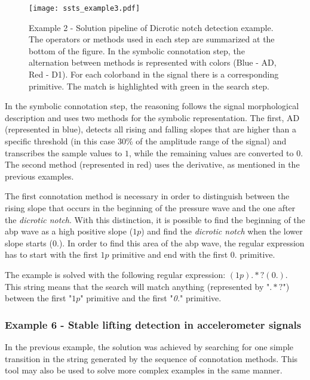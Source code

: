 \begin{figure}[H]
  \centering
      \texttt{[image: ssts\_example3.pdf]}
  \caption{Example 2 - Solution pipeline of Dicrotic notch detection example. The operators or methods used in each step are summarized at the bottom of the figure. In the symbolic connotation step, the alternation between methods is represented with colors (Blue - AD, Red - D1). For each colorband in the signal there is a corresponding primitive. The match is highlighted with green in the search step.}
  \label{fig:Exercise3}
\end{figure}

In the symbolic connotation step, the reasoning follows the signal morphological description and uses two methods for the symbolic representation. The first, AD (represented in blue), detects all rising and falling slopes that are higher than a specific threshold (in this case 30\% of the amplitude range of the signal) and transcribes the sample values to $1$, while the remaining values are converted to $0$. The second method (represented in red) uses the derivative, as mentioned in the previous examples.
\par
The first connotation method is necessary in order to distinguish between the rising slope that occurs in the beginning of the pressure wave and the one after the \textit{dicrotic notch}. With this distinction, it is possible to find the beginning of the \gls{abp} wave as a high positive slope ($1p$) and find the \textit{dicrotic notch} when the lower slope starts ($0.$). In order to find this area of the \gls{abp} wave, the regular expression has to start with the first $1p$ primitive and end with the first $0.$ primitive. 

\par
The example is solved with the following regular expression: $(1p).*?(0.)$. This string means that the search will match anything (represented by "$.*?$") between the first "$1p$" primitive and the first "\textit{0.}" primitive.

\subsubsection{Example 6 - Stable lifting detection in accelerometer signals}

In the previous example, the solution was achieved by searching for one simple transition in the string generated by the sequence of connotation methods. This tool may also be used to solve more complex examples in the same manner.


